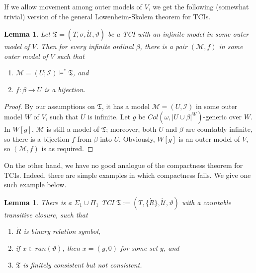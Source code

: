 \documentclass[12pt, twoside]{memoir}
\numberwithin{equation}{section}
\newtheorem{lem}[thm]{Lemma}
\theoremstyle{definition}
\theoremstyle{remark}
\theoremstyle{definition}
\theoremstyle{definition}
\theoremstyle{definition}
\theoremstyle{remark}
\begin{document}
If we allow movement among outer models of $V$, we get the following (somewhat trivial) version of the general Lowenheim-Skolem theorem for TCIs.

\begin{lem}\label{GLS}
Let $\mathfrak{T} = (T, \sigma, \dot{\mathcal{U}}, \vartheta)$ be a TCI with an infinite model in some outer model of $V$. Then for every infinite ordinal $\beta$, there is a pair $(\mathcal{M}, f)$ in some outer model of $V$ such that 
\begin{enumerate}[label=(\alph*)]
    \item $\mathcal{M} = (U; \mathcal{I}) \models^* \mathfrak{T}$, and
    \item $f : \beta \longrightarrow U$ is a bijection.
\end{enumerate}
\end{lem}

\begin{proof}
By our assumptions on $\mathfrak{T}$, it has a model $\mathcal{M} = (U, \mathcal{I})$ in some outer model $W$ of $V$, such that $U$ is infinite. Let $g$ be $Col(\omega, |U \cup \beta|^W)$-generic over $W$. In $W[g]$, $\mathcal{M}$ is still a model of $\mathfrak{T}$; moreover, both $U$ and $\beta$ are countably infinite, so there is a bijection $f$ from $\beta$ into $U$. Obviously, $W[g]$ is an outer model of $V$, so $(\mathcal{M}, f)$ is as required.
\end{proof}

On the other hand, we have no good analogue of the compactness theorem for TCIs. Indeed, there are simple examples in which compactness fails. We give one such example below.

\begin{lem}\label{countercom}
There is a $\Sigma_1 \cup \Pi_1$ TCI $\mathfrak{T} := (T, \{\dot{R}\}, \dot{\mathcal{U}}, \vartheta)$ with a countable transitive closure, such that
\begin{enumerate}[label=(\alph*)]
    \item $\dot{R}$ is binary relation symbol, 
    \item if $x \in ran(\vartheta)$, then $x = (y, 0)$ for some set $y$, and
    \item $\mathfrak{T}$ is finitely consistent but not consistent.
\end{enumerate}
\end{lem}
\end{document}
